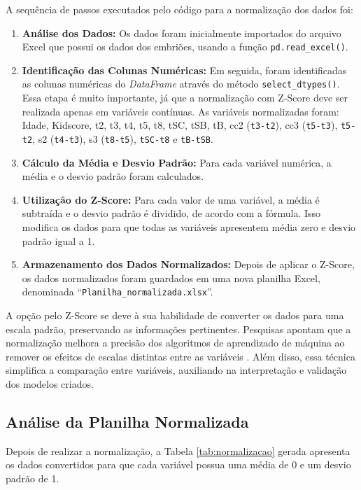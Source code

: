 A sequência de passos executados pelo código para a normalização dos dados foi:

\begin{enumerate}
    \item \textbf{Análise dos Dados:} Os dados foram inicialmente importados do arquivo Excel que possui os dados dos embriões, usando a função \texttt{pd.read\_excel()}.
    
    \item \textbf{Identificação das Colunas Numéricas:} Em seguida, foram identificadas as colunas numéricas do \textit{DataFrame} através do método \texttt{select\_dtypes()}. Essa etapa é muito importante, já que a normalização com Z-Score deve ser realizada apenas em variáveis contínuas. As variáveis normalizadas foram: Idade, Kidscore, t2, t3, t4, t5, t8, tSC, tSB, tB, cc2 (\texttt{t3-t2}), cc3 (\texttt{t5-t3}), \texttt{t5-t2}, s2 (\texttt{t4-t3}), s3 (\texttt{t8-t5}), \texttt{tSC-t8} e \texttt{tB-tSB}.
    
    \item \textbf{Cálculo da Média e Desvio Padrão:} Para cada variável numérica, a média e o desvio padrão foram calculados.
    
    \item \textbf{Utilização do Z-Score:} Para cada valor de uma variável, a média é subtraída e o desvio padrão é dividido, de acordo com a fórmula. Isso modifica os dados para que todas as variáveis apresentem média zero e desvio padrão igual a 1.
    
    \item \textbf{Armazenamento dos Dados Normalizados:} Depois de aplicar o Z-Score, os dados normalizados foram guardados em uma nova planilha Excel, denominada “\texttt{Planilha\_normalizada.xlsx}”.
\end{enumerate}

A opção pelo Z-Score se deve à sua habilidade de converter os dados para uma escala padrão, preservando as informações pertinentes. Pesquisas apontam que a normalização melhora a precisão dos algoritmos de aprendizado de máquina ao remover os efeitos de escalas distintas entre as variáveis \cite{jaiswal2024}. Além disso, essa técnica simplifica a comparação entre variáveis, auxiliando na interpretação e validação dos modelos criados.

\subsection*{Análise da Planilha Normalizada}
Depois de realizar a normalização, a Tabela \ref{tab:normalizacao} gerada apresenta os dados convertidos para que cada variável possua uma média de 0 e um desvio padrão de 1. 

